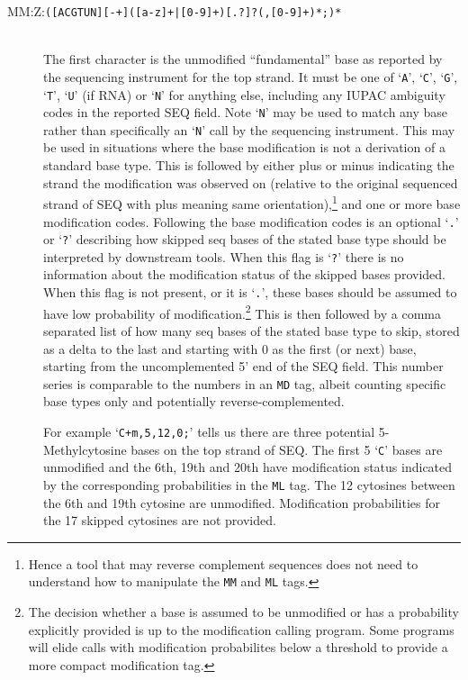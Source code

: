 \documentclass[10pt]{article}
\newcommand{\tagregex}[1]{{\tt #1}}
\begin{document}
\begin{description}
\item[MM:Z:\tagregex{([ACGTUN][-+]([a-z]+|[0-9]+)[.?]?(,[0-9]+)*;)*}]
\hfill\\
The first character is the unmodified ``fundamental'' base as reported
by the sequencing instrument for the top strand.
It must be one of `{\tt A}', `{\tt C}', `{\tt G}', `{\tt T}', `{\tt U}' (if RNA) or `{\tt N}' for anything else, including any IUPAC ambiguity codes in the reported SEQ field.
Note `{\tt N}' may be used to match any base rather than specifically an `{\tt N}' call by the sequencing instrument.
This may be used in situations where the base modification is not a derivation of a standard base type.
This is followed by either plus or minus indicating the strand the modification was observed on (relative to the original sequenced strand of {\sf SEQ} with plus meaning same orientation),\footnote{Hence a tool that may reverse complement sequences does not need to understand how to manipulate the {\tt MM} and {\tt ML} tags.} and one or more base modification codes.
Following the base modification codes is an optional `{\tt .}' or `{\tt ?}' describing how skipped seq bases of the stated base type should be interpreted by downstream tools.
When this flag is `{\tt ?}' there is no information about the modification status of the skipped bases provided.
When this flag is not present, or it is `{\tt .}', these bases should be assumed to have low probability of modification.\footnote{The decision whether a base is assumed to be unmodified or has a probability explicitly provided is up to the modification calling program. Some programs will elide calls with modification probabilites below a threshold to provide a more compact modification tag.}
This is then followed by a comma separated list of how many seq bases of the stated base type to skip, stored as a delta to the last and starting with 0 as the first (or next) base, starting from the uncomplemented 5' end of the {\sf SEQ} field.
This number series is comparable to the numbers in an {\tt MD} tag,
albeit counting specific base types only and potentially reverse-complemented.

For example `{\tt C+m,5,12,0;}' tells us there are three
potential 5-Methylcytosine bases on the top strand of {\sf SEQ}.
The first 5 `{\tt C}' bases are unmodified and the 6th, 19th and 20th have modification status indicated by the corresponding probabilities in the {\tt ML} tag. The 12 cytosines between the 6th and 19th cytosine are unmodified. Modification probabilities for the 17 skipped cytosines are not provided.


\end{description}
\end{document}
